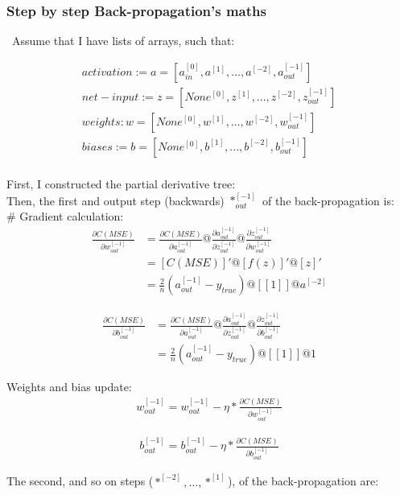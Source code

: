 \subsubsection{Step by step Back-propagation's maths}
\label{chap:Step by step Back-propagation's maths}

\qquad \, Assume that I have lists of arrays, such that:

\begin{align*}
activation := a = [a_{in}^{[0]}, a^{[1]}, ..., a^{[-2]}, a_{out}^{[-1]}]\\
net-input := z = [None^{[0]}, z^{[1]}, ..., z^{[-2]}, z_{out}^{[-1]}]\\
weights: w = [None^{[0]}, w^{[1]}, ..., w^{[-2]}, w_{out}^{[-1]}]\\
biases := b = [None^{[0]}, b^{[1]}, ..., b^{[-2]}, b_{out}^{[-1]}]\\
\end{align*}

First, I constructed the partial derivative tree:\\

Then, the first and output step (backwards) $*_{out}^{[-1]}$ of the back-propagation is:\\

# Gradient calculation:\\
\begin{align*}
\frac{\partial C(MSE)}{\partial w_{out}^{[-1]}} &= \frac{\partial C(MSE)}{\partial a_{out}^{[-1]}} @ \frac{\partial a_{out}^{[-1]}}{\partial z_{out}^{[-1]}} @ \frac{\partial z_{out}^{[-1]}}{\partial w_{out}^{[-1]}}\\
&= [C(MSE)]' @ [f(z)]' @ [z]'\\
&= \frac{2}{n}(a_{out}^{[-1]}-y_{true}) @ [[1]] @ a^{[-2]}
\end{align*}

\begin{align*}
\frac{\partial C (MSE)}{\partial b_{out}^{[-1]}} &= \frac{\partial C (MSE)}{\partial a_{out}^{[-1]}} @ \frac{\partial a_{out}^{[-1]}}{\partial z_{out}^{[-1]}} @ \frac{\partial z_{out}^{[-1]}}{\partial b_{out}^{[-1]}}\\ 
&= \frac{2}{n}(a_{out}^{[-1]}-y_{true})@ [[1]] @ 1
\end{align*}

Weights and bias update:\\

\begin{align*}
w_{out}^{[-1]} = w_{out}^{[-1]} - \eta * \frac{\partial C(MSE)}{\partial w_{out}^{[-1]}}
\end{align*}

\begin{align*}
b_{out}^{[-1]} = b_{out}^{[-1]} - \eta * \frac{\partial C(MSE)}{\partial b_{out}^{[-1]}}
\end{align*}

The second, and so on steps ($*^{[-2]}, ..., *^{[1]}$), of the back-propagation are:\\

